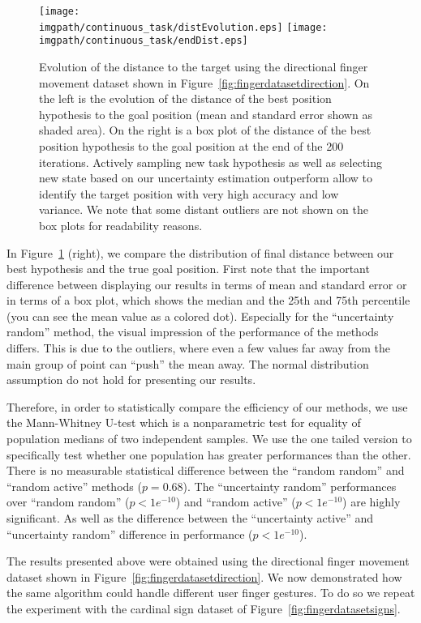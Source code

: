 \begin{figure}[!htbp]
\centering
\texttt{[image: \\imgpath/continuous\_task/distEvolution.eps]}
\texttt{[image: \\imgpath/continuous\_task/endDist.eps]}
\caption{Evolution of the distance to the target using the directional finger movement dataset shown in Figure~\ref{fig:fingerdatasetdirection}. On the left is the evolution of the distance of the best position hypothesis to the goal position (mean and standard error shown as shaded area). On the right is a box plot of the distance of the best position hypothesis to the goal position at the end of the 200 iterations. Actively sampling new task hypothesis as well as selecting new state based on our uncertainty estimation outperform allow to identify the target position with very high accuracy and low variance. We note that some distant outliers are not shown on the box plots for readability reasons.}
\label{fig:continuoustaskdistevolution}
\end{figure}

In Figure~\ref{fig:continuoustaskdistevolution} (right), we compare the distribution of final distance between our best hypothesis and the true goal position. First note that the important difference between displaying our results in terms of mean and standard error or in terms of a box plot, which shows the median and the 25th and 75th percentile (you can see the mean value as a colored dot). Especially for the ``uncertainty random'' method, the visual impression of the performance of the methods differs. This is due to the outliers, where even a few values far away from the main group of point can ``push'' the mean away. The normal distribution assumption do not hold for presenting our results. 

Therefore, in order to statistically compare the efficiency of our methods, we use the Mann-Whitney U-test \cite{mann1947test} which is a nonparametric test for equality of population medians of two independent samples. We use the one tailed version to specifically test whether one population has greater performances than the other. There is no measurable statistical difference between the ``random random'' and ``random active'' methods ($p = 0.68$). The ``uncertainty random'' performances over ``random random'' ($p<1e^{-10}$) and ``random active'' ($p<1e^{-10}$) are highly significant. As well as the difference between the ``uncertainty active'' and ``uncertainty random'' difference in performance ($p<1e^{-10}$).

The results presented above were obtained using the directional finger movement dataset shown in Figure~\ref{fig:fingerdatasetdirection}. We now demonstrated how the same algorithm could handle different user finger gestures. To do so we repeat the experiment with the cardinal sign dataset of Figure~\ref{fig:fingerdatasetsigns}.


